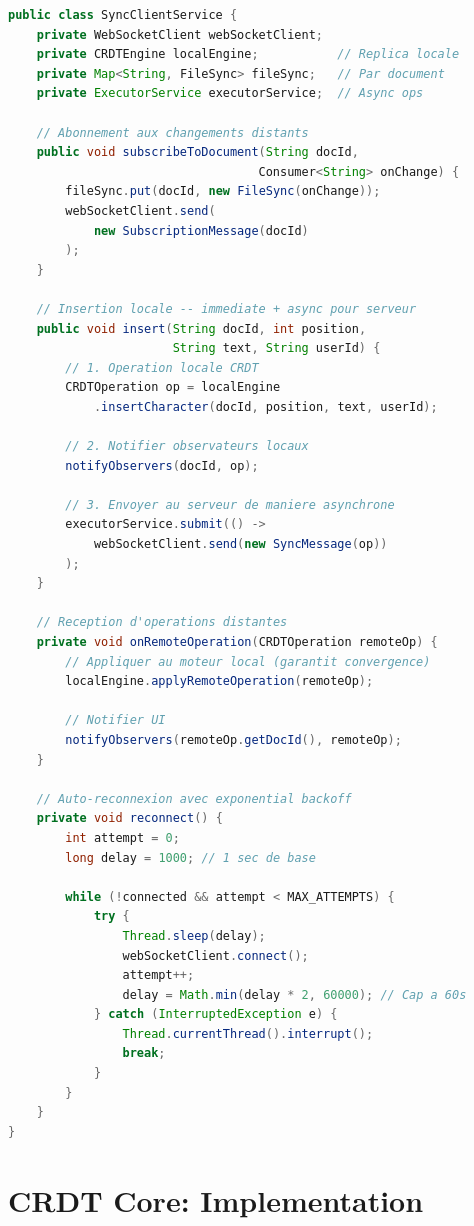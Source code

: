 \documentclass[11pt,a4paper,hidelinks]{book}
\begin{document}
\begin{lstlisting}[language=Java, caption={Squelette du SyncClientService}]
public class SyncClientService {
    private WebSocketClient webSocketClient;
    private CRDTEngine localEngine;           // Replica locale
    private Map<String, FileSync> fileSync;   // Par document
    private ExecutorService executorService;  // Async ops
    
    // Abonnement aux changements distants
    public void subscribeToDocument(String docId, 
                                   Consumer<String> onChange) {
        fileSync.put(docId, new FileSync(onChange));
        webSocketClient.send(
            new SubscriptionMessage(docId)
        );
    }
    
    // Insertion locale -- immediate + async pour serveur
    public void insert(String docId, int position, 
                       String text, String userId) {
        // 1. Operation locale CRDT
        CRDTOperation op = localEngine
            .insertCharacter(docId, position, text, userId);
        
        // 2. Notifier observateurs locaux
        notifyObservers(docId, op);
        
        // 3. Envoyer au serveur de maniere asynchrone
        executorService.submit(() -> 
            webSocketClient.send(new SyncMessage(op))
        );
    }
    
    // Reception d'operations distantes
    private void onRemoteOperation(CRDTOperation remoteOp) {
        // Appliquer au moteur local (garantit convergence)
        localEngine.applyRemoteOperation(remoteOp);
        
        // Notifier UI
        notifyObservers(remoteOp.getDocId(), remoteOp);
    }
    
    // Auto-reconnexion avec exponential backoff
    private void reconnect() {
        int attempt = 0;
        long delay = 1000; // 1 sec de base
        
        while (!connected && attempt < MAX_ATTEMPTS) {
            try {
                Thread.sleep(delay);
                webSocketClient.connect();
                attempt++;
                delay = Math.min(delay * 2, 60000); // Cap a 60s
            } catch (InterruptedException e) {
                Thread.currentThread().interrupt();
                break;
            }
        }
    }
}
\end{lstlisting}

\section{CRDT Core: Implementation}
\end{document}
